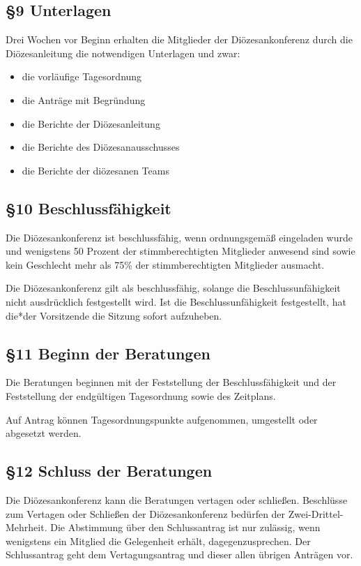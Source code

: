 \documentclass[12pt]{report}
\begin{document}
\begin{flushleft}
\subsection*{§9 Unterlagen}
Drei Wochen vor Beginn erhalten die Mitglieder der Diözesankonferenz durch die Diözesanleitung die notwendigen
Unterlagen und zwar:
\begin{itemize}
  \item die vorläufige Tagesordnung
  \item die Anträge mit Begründung
  \item die Berichte der Diözesanleitung 
  \item die Berichte des Diözesanausschusses 
  \item die Berichte der diözesanen Teams
\end{itemize}

\subsection*{§10 Beschlussfähigkeit}
Die Diözesankonferenz ist beschlussfähig, wenn ordnungsgemäß eingeladen wurde und wenigstens 50 Prozent
der stimmberechtigten Mitglieder anwesend sind sowie kein Geschlecht mehr als 75\% der stimmberechtigten Mitglieder ausmacht.

Die Diözesankonferenz gilt als beschlussfähig, solange die Beschlussunfähigkeit nicht ausdrücklich
festgestellt wird. Ist die Beschlussunfähigkeit festgestellt, hat die*der Vorsitzende die Sitzung sofort aufzuheben.

\subsection*{§11 Beginn der Beratungen}
Die Beratungen beginnen mit der Feststellung der Beschlussfähigkeit und der Feststellung der endgültigen
Tagesordnung sowie des Zeitplans.

Auf Antrag können Tagesordnungspunkte aufgenommen, umgestellt oder abgesetzt werden.
\subsection*{§12 Schluss der Beratungen}
Die Diözesankonferenz kann die Beratungen vertagen oder schließen. Beschlüsse zum Vertagen oder Schließen
der Diözesankonferenz bedürfen der Zwei-Drittel-Mehrheit. Die Abstimmung über den Schlussantrag ist
nur zulässig, wenn wenigstens ein Mitglied die Gelegenheit erhält, dagegenzusprechen. Der Schlussantrag
geht dem Vertagungsantrag und dieser allen übrigen Anträgen vor.

\end{flushleft}
\end{document}
